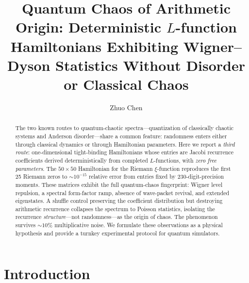 \documentclass[aps,prx,reprint,floatfix]{revtex4-2}
\begin{document}
\title{Quantum Chaos of Arithmetic Origin: Deterministic $L$-function Hamiltonians Exhibiting Wigner--Dyson Statistics Without Disorder or Classical Chaos}
\author{Zhuo Chen}

\begin{abstract}
The two known routes to quantum-chaotic spectra---quantization of classically
chaotic systems and Anderson disorder---share a common feature: randomness
enters either through classical dynamics or through Hamiltonian parameters.
Here we report a \emph{third route}: one-dimensional tight-binding
Hamiltonians whose entries are Jacobi recurrence coefficients derived
deterministically from completed $L$-functions, with \emph{zero free
parameters}. The $50\times50$ Hamiltonian for the Riemann $\xi$-function
reproduces the first 25 Riemann zeros to $\sim10^{-15}$ relative error from
entries fixed by 230-digit-precision moments. These matrices exhibit the
full quantum-chaos fingerprint: Wigner level repulsion, a spectral
form-factor ramp, absence of wave-packet revival, and extended eigenstates.
A shuffle control preserving the coefficient distribution but destroying
arithmetic recurrence collapses the spectrum to Poisson statistics,
isolating the recurrence \emph{structure}---not randomness---as the
origin of chaos. The phenomenon survives $\sim10\%$ multiplicative noise.
We formulate these observations as a physical hypothesis and provide a
turnkey experimental protocol for quantum simulators.
\end{abstract}


\maketitle

\section{Introduction}
\label{sec:intro}
\end{document}
